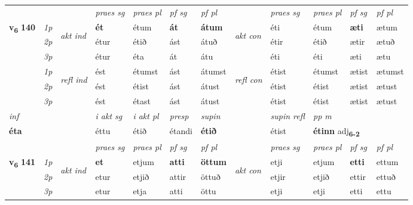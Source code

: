 \begin{longtable}[l]{X>{\footnotesize\itshape}llXXXXlXXXX}
 & &   & \textit{praes sg}  & \textit{praes pl}    & \textit{ pf sg} & \textit{pf pl} & & \textit{praes sg}  & \textit{praes pl}    & \textit{pf sg} & \textit{pf pl }  \\ \cmidrule{4-7} \cmidrule{9-12}
 \multirow{2}{*}{{{\textbf{v{\textsubscript{6}}} \Large{\textbf{140}}}}}  & 1p & \multirow{3}{*}{\begin{turn}{90}\textit{akt ind}\end{turn}} & \textbf{ét} & étum & \textbf{át} & \textbf{átum} & \multirow{3}{*}{\begin{turn}{90}\textit{akt con}\end{turn}} &éti & étum & \textbf{æti} & ætum\\*
 & 2p &  &  étur  & étið & ást & átuð & & étir & étið & ætir & ætuð \\*
 & 3p &  & étur & éta & át & átu & & éti & éti& æti & ætu \\*
\cmidrule{4-7} \cmidrule{9-12}
 & 1p & \multirow{3}{*}{\begin{turn}{90}\textit{refl ind}\end{turn}}  & ést & étumst & ást & átumst & \multirow{3}{*}{\begin{turn}{90}\textit{refl con}\end{turn}}  &étist & étumst & ætist & ætumst \\*
 & 2p &  & ést & étist & ást & átust & &étist & étist & ætist & ætust \\*
 & 3p  & & ést & étast & ást & átust & & étist & étist& ætist & ætust \\*
\cmidrule{4-7} \cmidrule{9-12}

   {\textit{inf}} & &  & \textit{i akt sg} & \textit{i akt pl}   & \textit{presp} & \textit{supin} && \textit{supin refl} & \textit{pp m} \\*
  {\textbf{éta}} & && éttu  & étið   & étandi &  \textbf{étið} && étist & \multicolumn{2}{l}{\textbf{étinn} adj\textbf{\textsubscript{6-2}}} \\*

\midrule

 \midrule
 & &   & \textit{praes sg}  & \textit{praes pl}    & \textit{ pf sg} & \textit{pf pl} & & \textit{praes sg}  & \textit{praes pl}    & \textit{pf sg} & \textit{pf pl }  \\ \cmidrule{4-7} \cmidrule{9-12}
 \multirow{2}{*}{{{\textbf{v{\textsubscript{6}}} \Large{\textbf{141}}}}}  & 1p & \multirow{3}{*}{\begin{turn}{90}\textit{akt ind}\end{turn}} & \textbf{et} & etjum & \textbf{atti} & \textbf{öttum} & \multirow{3}{*}{\begin{turn}{90}\textit{akt con}\end{turn}} &etji & etjum & \textbf{etti} & ettum\\*
 & 2p &  &  etur  & etjið & attir & öttuð & & etjir & etjið & ettir & ettuð \\*
 & 3p &  & etur & etja & atti & öttu & & etji & etji& etti & ettu \\*
\cmidrule{4-7} \cmidrule{9-12}


\end{longtable}

